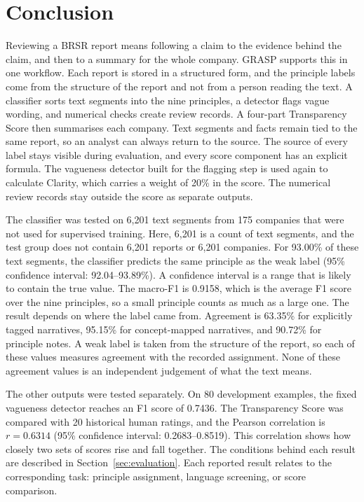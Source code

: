 \section{Conclusion}
\label{sec:conclusion}

Reviewing a BRSR report means following a claim to the evidence behind the claim, and then to a summary for the whole company. GRASP supports this in one workflow. Each report is stored in a structured form, and the principle labels come from the structure of the report and not from a person reading the text. A classifier sorts text segments into the nine principles, a detector flags vague wording, and numerical checks create review records. A four-part Transparency Score then summarises each company. Text segments and facts remain tied to the same report, so an analyst can always return to the source. The source of every label stays visible during evaluation, and every score component has an explicit formula. The vagueness detector built for the flagging step is used again to calculate Clarity, which carries a weight of 20\% in the score. The numerical review records stay outside the score as separate outputs.

The classifier was tested on 6,201 text segments from 175 companies that were not used for supervised training. Here, 6,201 is a count of text segments, and the test group does not contain 6,201 reports or 6,201 companies. For 93.00\% of these text segments, the classifier predicts the same principle as the weak label (95\% confidence interval: 92.04--93.89\%). A confidence interval is a range that is likely to contain the true value. The macro-F1 is 0.9158, which is the average F1 score over the nine principles, so a small principle counts as much as a large one. The result depends on where the label came from. Agreement is 63.35\% for explicitly tagged narratives, 95.15\% for concept-mapped narratives, and 90.72\% for principle notes. A weak label is taken from the structure of the report, so each of these values measures agreement with the recorded assignment. None of these agreement values is an independent judgement of what the text means.

The other outputs were tested separately. On 80 development examples, the fixed vagueness detector reaches an F1 score of 0.7436. The Transparency Score was compared with 20 historical human ratings, and the Pearson correlation is $r=0.6314$ (95\% confidence interval: 0.2683--0.8519). This correlation shows how closely two sets of scores rise and fall together. The conditions behind each result are described in Section~\ref{sec:evaluation}. Each reported result relates to the corresponding task: principle assignment, language screening, or score comparison.

